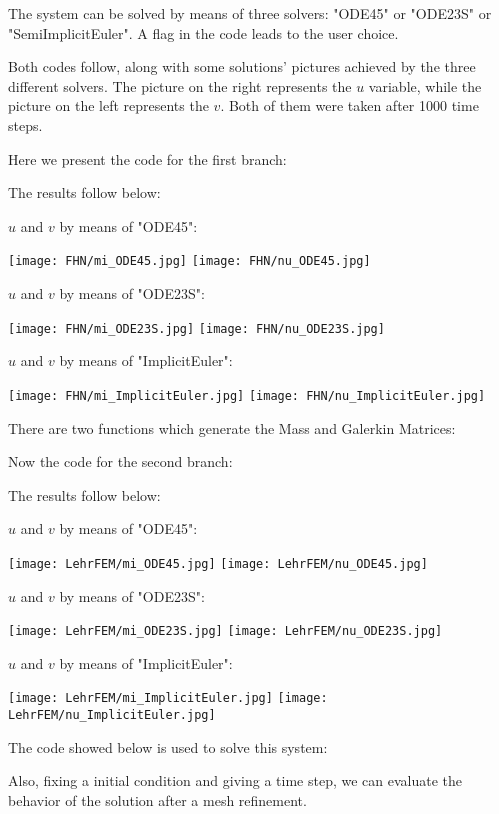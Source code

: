 \documentclass[a4paper]{article}
\begin{document}
The system can be solved by means of three solvers: "ODE45" or "ODE23S" or "SemiImplicitEuler". A flag in the code leads to the user choice.

Both codes follow, along with some solutions' pictures achieved by the three different solvers. The picture on the right represents the $u$ variable, while the picture on the left represents the $v$. Both of them were taken after 1000 time steps.

Here we present the code for the first branch:

The results follow below:

$u$ and $v$ by means of "ODE45":

\texttt{[image: FHN/mi\_ODE45.jpg]}
\texttt{[image: FHN/nu\_ODE45.jpg]}

$u$ and $v$ by means of "ODE23S":

\texttt{[image: FHN/mi\_ODE23S.jpg]}
\texttt{[image: FHN/nu\_ODE23S.jpg]}

$u$ and $v$ by means of "ImplicitEuler":

\texttt{[image: FHN/mi\_ImplicitEuler.jpg]}
\texttt{[image: FHN/nu\_ImplicitEuler.jpg]}

There are two functions which generate the Mass and Galerkin Matrices:




Now the code for the second branch:



The results follow below:

$u$ and $v$ by means of "ODE45":

\texttt{[image: LehrFEM/mi\_ODE45.jpg]}
\texttt{[image: LehrFEM/nu\_ODE45.jpg]}

$u$ and $v$ by means of "ODE23S":

\texttt{[image: LehrFEM/mi\_ODE23S.jpg]}
\texttt{[image: LehrFEM/nu\_ODE23S.jpg]}

$u$ and $v$ by means of "ImplicitEuler":

\texttt{[image: LehrFEM/mi\_ImplicitEuler.jpg]}
\texttt{[image: LehrFEM/nu\_ImplicitEuler.jpg]}

The code showed below is used to solve this system:



Also, fixing a initial condition and giving a time step, we can evaluate the behavior of the solution after a mesh refinement.
\end{document}
